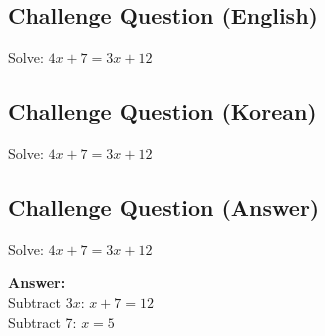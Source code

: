 \cleardoublepage
\subsection*{Challenge Question (English)}
Solve: $4x + 7 = 3x + 12$


\newpage
\subsection*{Challenge Question (Korean)}
Solve: $4x + 7 = 3x + 12$


\newpage
\subsection*{Challenge Question (Answer)}
Solve: $4x + 7 = 3x + 12$

\textbf{Answer:}\\
Subtract $3x$: $x + 7 = 12$\\
Subtract 7: $x = 5$
